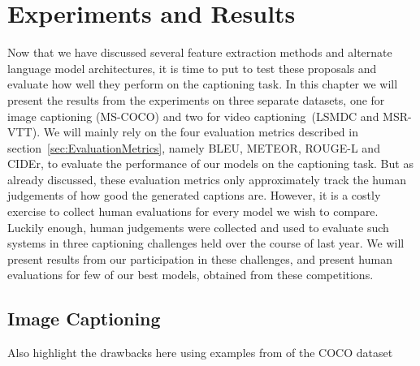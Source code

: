 \chapter{Experiments and Results}
\label{chapter:results}

Now that we have discussed several feature extraction methods and alternate
language model architectures, it is time to put to test these proposals and
evaluate how well they perform on the captioning task.
In this chapter we will present the results from the experiments on three
separate datasets, one for image captioning (MS-COCO) and two for video
captioning~(LSMDC and MSR-VTT).
We will mainly rely on the four evaluation metrics described in
section~\ref{sec:EvaluationMetrics}, namely BLEU, METEOR, ROUGE-L and CIDEr, to
evaluate the performance of our models on the captioning task.
But as already discussed, these evaluation metrics only approximately track the
human judgements of how good the generated captions are.
However, it is a costly exercise to collect human evaluations for every model we
wish to compare.
Luckily enough, human judgements were collected and used to evaluate such
systems in three captioning challenges held over the course of last year.
We will present results from our participation in these challenges, and present
human evaluations for few of our best models, obtained from these competitions.

\section{Image Captioning}
Also highlight the drawbacks here using examples from of the COCO dataset

